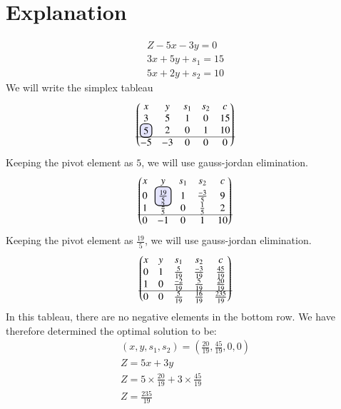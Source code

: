 \documentclass[journal,12pt,twocolumn]{IEEEtran}
\begin{document}
\section{Explanation}
\begin{align}
Z-5x-3y=0\\
3x+5y+s_1=15\\
5x+2y+s_2=10
\end{align}
We will write the simplex tableau
\begin{align}
\myvec{
 x & y & s_1 & s_2 & c  \\ 
  3 & 5 & 1 & 0 & 15 \\ 
  \hlight{5} & 2 & 0 & 1 & 10  \\ \hline
  -5 & -3 & 0 & 0 & 0 
}
\end{align}
Keeping the pivot element as $5$, we will use gauss-jordan elimination.
\begin{align}
\myvec{
  x & y & s_1 & s_2 & c  \\[0.1cm] 
  0 & \hlight{\frac{19}{5}} & 1 & \frac{-3}{5} & 9 \\
  1 & \frac{2}{5} & 0 & \frac{1}{5} & 2  \\ \hline
  0 & -1 & 0 & 1 & 10 
}
\end{align}
Keeping the pivot element as $\frac{19}{5}$, we will use gauss-jordan elimination.
\begin{align}
\begin{pmatrix}
  x & y & s_1 & s_2 & c  \\ 
  0 & 1 & \frac{5}{19} & \frac{-3}{19} & \frac{45}{19} \\ 
  1 & 0 & \frac{-2}{19} & \frac{5}{19} & \frac{20}{19}  \\ \hline 
  0 & 0 & \frac{5}{19} & \frac{16}{19} & \frac{235}{19} \\
\end{pmatrix}
\end{align}
In this tableau, there are no negative elements in the bottom row. We have therefore determined the optimal solution to be:
\begin{align}
(x,y,s_1,s_2)=\left(\frac{20}{19},\frac{45}{19},0,0\right)\\
Z=5x+3y\\
Z=5\times\frac{20}{19}+3\times\frac{45}{19}\\
Z=\frac{235}{19}
\end{align}
\end{document}
